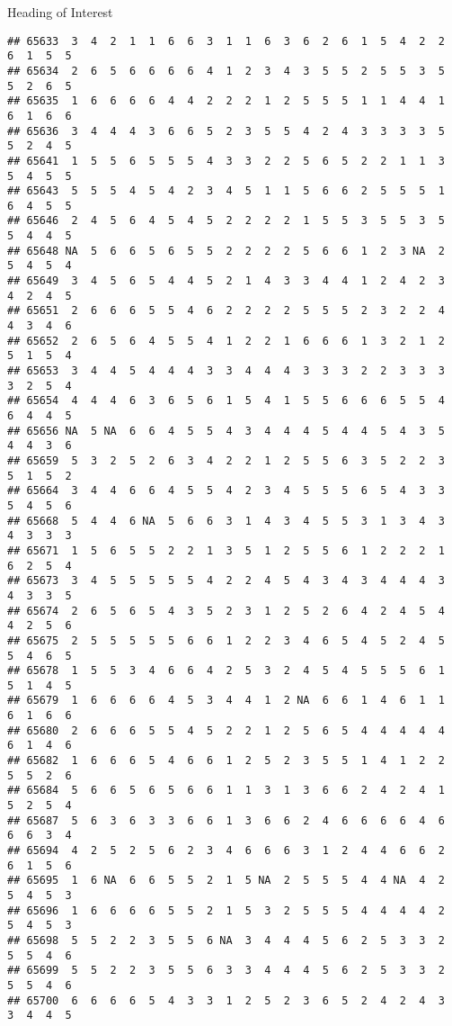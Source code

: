 \documentclass[
  ignorenonframetext,
]{beamer}
\begin{document}
\begin{frame}[fragile]{Heading of Interest}
\begin{verbatim}
## 65633  3  4  2  1  1  6  6  3  1  1  6  3  6  2  6  1  5  4  2  2  6  1  5  5
## 65634  2  6  5  6  6  6  6  4  1  2  3  4  3  5  5  2  5  5  3  5  5  2  6  5
## 65635  1  6  6  6  6  4  4  2  2  2  1  2  5  5  5  1  1  4  4  1  6  1  6  6
## 65636  3  4  4  4  3  6  6  5  2  3  5  5  4  2  4  3  3  3  3  5  5  2  4  5
## 65641  1  5  5  6  5  5  5  4  3  3  2  2  5  6  5  2  2  1  1  3  5  4  5  5
## 65643  5  5  5  4  5  4  2  3  4  5  1  1  5  6  6  2  5  5  5  1  6  4  5  5
## 65646  2  4  5  6  4  5  4  5  2  2  2  2  1  5  5  3  5  5  3  5  5  4  4  5
## 65648 NA  5  6  6  5  6  5  5  2  2  2  2  5  6  6  1  2  3 NA  2  5  4  5  4
## 65649  3  4  5  6  5  4  4  5  2  1  4  3  3  4  4  1  2  4  2  3  4  2  4  5
## 65651  2  6  6  6  5  5  4  6  2  2  2  2  5  5  5  2  3  2  2  4  4  3  4  6
## 65652  2  6  5  6  4  5  5  4  1  2  2  1  6  6  6  1  3  2  1  2  5  1  5  4
## 65653  3  4  4  5  4  4  4  3  3  4  4  4  3  3  3  2  2  3  3  3  3  2  5  4
## 65654  4  4  4  6  3  6  5  6  1  5  4  1  5  5  6  6  6  5  5  4  6  4  4  5
## 65656 NA  5 NA  6  6  4  5  5  4  3  4  4  4  5  4  4  5  4  3  5  4  4  3  6
## 65659  5  3  2  5  2  6  3  4  2  2  1  2  5  5  6  3  5  2  2  3  5  1  5  2
## 65664  3  4  4  6  6  4  5  5  4  2  3  4  5  5  5  6  5  4  3  3  5  4  5  6
## 65668  5  4  4  6 NA  5  6  6  3  1  4  3  4  5  5  3  1  3  4  3  4  3  3  3
## 65671  1  5  6  5  5  2  2  1  3  5  1  2  5  5  6  1  2  2  2  1  6  2  5  4
## 65673  3  4  5  5  5  5  5  4  2  2  4  5  4  3  4  3  4  4  4  3  4  3  3  5
## 65674  2  6  5  6  5  4  3  5  2  3  1  2  5  2  6  4  2  4  5  4  4  2  5  6
## 65675  2  5  5  5  5  5  6  6  1  2  2  3  4  6  5  4  5  2  4  5  5  4  6  5
## 65678  1  5  5  3  4  6  6  4  2  5  3  2  4  5  4  5  5  5  6  1  5  1  4  5
## 65679  1  6  6  6  6  4  5  3  4  4  1  2 NA  6  6  1  4  6  1  1  6  1  6  6
## 65680  2  6  6  6  5  5  4  5  2  2  1  2  5  6  5  4  4  4  4  4  6  1  4  6
## 65682  1  6  6  6  5  4  6  6  1  2  5  2  3  5  5  1  4  1  2  2  5  5  2  6
## 65684  5  6  6  5  6  5  6  6  1  1  3  1  3  6  6  2  4  2  4  1  5  2  5  4
## 65687  5  6  3  6  3  3  6  6  1  3  6  6  2  4  6  6  6  6  4  6  6  6  3  4
## 65694  4  2  5  2  5  6  2  3  4  6  6  6  3  1  2  4  4  6  6  2  6  1  5  6
## 65695  1  6 NA  6  6  5  5  2  1  5 NA  2  5  5  5  4  4 NA  4  2  5  4  5  3
## 65696  1  6  6  6  6  5  5  2  1  5  3  2  5  5  5  4  4  4  4  2  5  4  5  3
## 65698  5  5  2  2  3  5  5  6 NA  3  4  4  4  5  6  2  5  3  3  2  5  5  4  6
## 65699  5  5  2  2  3  5  5  6  3  3  4  4  4  5  6  2  5  3  3  2  5  5  4  6
## 65700  6  6  6  6  5  4  3  3  1  2  5  2  3  6  5  2  4  2  4  3  3  4  4  5

\end{verbatim}
\end{frame}
\end{document}

